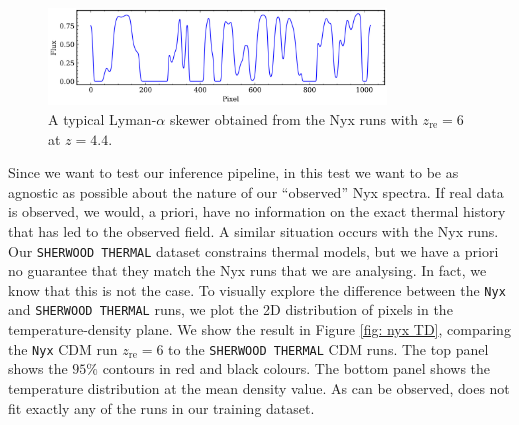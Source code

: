 \begin{figure}
    \centering
    \includegraphics[width=0.8\textwidth]{img/ML/nyx_skewer.png}
    \caption{A typical Lyman-$\alpha$ skewer obtained from the Nyx runs with $z_\mathrm{re}=6$ at $z=4.4$.}
    \label{fig: nyx skewer}
\end{figure}
Since we want to test our inference pipeline, in this test we want to be as agnostic as possible about the nature of our ``observed'' Nyx spectra. If real data is observed, we would, a priori, have no information on the exact thermal history that has led to the observed field. A similar situation occurs with the Nyx runs. Our \texttt{SHERWOOD THERMAL} dataset constrains thermal models, but we have a priori no guarantee that they match the Nyx runs that we are analysing. In fact, we know that this is not the case. To visually explore the difference between the \texttt{Nyx} and \texttt{SHERWOOD THERMAL} runs, we plot the 2D distribution of pixels in the temperature-density plane. We show the result in Figure \ref{fig: nyx TD}, comparing the \texttt{Nyx} CDM run $z_\mathrm{re}=6$ to the \texttt{SHERWOOD THERMAL} CDM runs. The top panel shows the $95\%$ contours in red and black colours. The bottom panel shows the temperature distribution at the mean density value. As can be observed,  does not fit exactly any of the runs in our training dataset.


